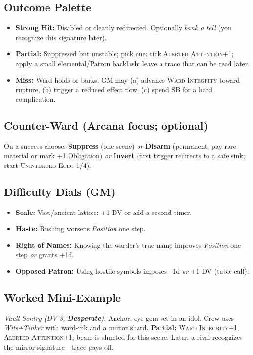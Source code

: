 \subsection*{Outcome Palette}
\begin{itemize}
    \item \textbf{Strong Hit:} Disabled or cleanly redirected. Optionally \emph{bank a tell} (you recognize this signature later).
    \item \textbf{Partial:} Suppressed but unstable; pick one: tick \textsc{Alerted Attention}+1; apply a small elemental/Patron backlash; leave a trace that can be read later.
    \item \textbf{Miss:} Ward holds or barks. GM may (a) advance \textsc{Ward Integrity} toward rupture, (b) trigger a reduced effect now, (c) spend SB for a hard complication.
\end{itemize}

\subsection*{Counter-Ward (Arcana focus; optional)}
On a success choose: \textbf{Suppress} (one scene) \emph{or} \textbf{Disarm} (permanent; pay rare material or mark +1 Obligation) \emph{or} \textbf{Invert} (first trigger redirects to a safe sink; start \textsc{Unintended Echo} 1/4).

\subsection*{Difficulty Dials (GM)}
\begin{itemize}
    \item \textbf{Scale:} Vast/ancient lattice: +1 DV or add a second timer.
    \item \textbf{Haste:} Rushing worsens \emph{Position} one step.
    \item \textbf{Right of Names:} Knowing the warder's true name improves \emph{Position} one step \emph{or} grants +1d.
    \item \textbf{Opposed Patron:} Using hostile symbols imposes --1d \emph{or} +1 DV (table call).
\end{itemize}

\subsection*{Worked Mini-Example}
\emph{Vault Sentry (DV 3, \textbf{Desperate}).} Anchor: eye-gem set in an idol. Crew uses \emph{Wits+Tinker} with ward-ink and a mirror shard. \textbf{Partial:} \textsc{Ward Integrity}+1, \textsc{Alerted Attention}+1; beam is shunted for this scene. Later, a rival recognizes the mirror signature---trace pays off.

